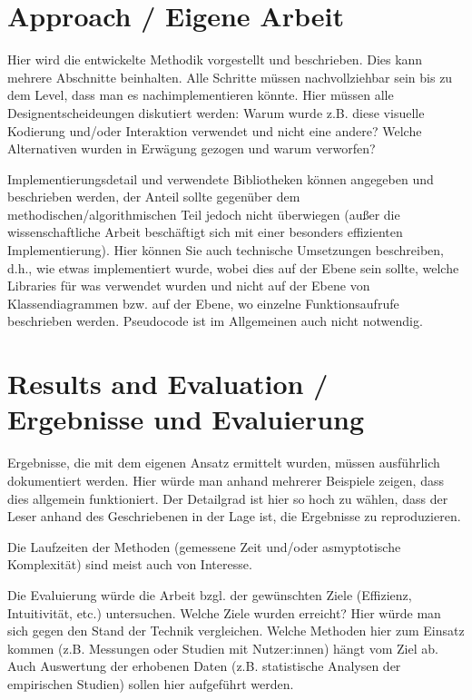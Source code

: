 \documentclass{article}
\begin{document}
\section{Approach / Eigene Arbeit} 
Hier wird die entwickelte Methodik vorgestellt und beschrieben.
Dies kann mehrere Abschnitte beinhalten. Alle Schritte müssen nachvollziehbar sein bis zu dem Level, dass man es nachimplementieren könnte.
Hier müssen alle Designentscheideungen diskutiert werden: Warum wurde z.B. diese visuelle Kodierung und/oder Interaktion verwendet und nicht eine andere? Welche Alternativen wurden in Erwägung gezogen und warum verworfen?

Implementierungsdetail und verwendete Bibliotheken können angegeben und beschrieben werden, der Anteil sollte gegenüber dem methodischen/algorithmischen Teil jedoch nicht überwiegen 
(außer die wissenschaftliche Arbeit beschäftigt sich mit einer besonders effizienten Implementierung).
Hier können Sie auch technische Umsetzungen beschreiben, d.h., wie etwas implementiert wurde, wobei dies auf der Ebene sein sollte, welche Libraries für was verwendet wurden und nicht auf der Ebene von Klassendiagrammen bzw. auf der Ebene, wo einzelne Funktionsaufrufe beschrieben werden. Pseudocode ist im Allgemeinen auch nicht notwendig.


\section{Results and Evaluation / Ergebnisse und Evaluierung} Ergebnisse, die mit dem eigenen Ansatz ermittelt wurden, müssen ausführlich dokumentiert werden. Hier würde man anhand mehrerer Beispiele zeigen, dass dies allgemein funktioniert. Der Detailgrad ist hier so hoch zu wählen, dass der Leser anhand des Geschriebenen in der Lage ist, die Ergebnisse zu reproduzieren. 

Die Laufzeiten der Methoden (gemessene Zeit und/oder asmyptotische Komplexität) sind meist auch von Interesse.

Die Evaluierung würde die Arbeit bzgl. der gewünschten Ziele (Effizienz, Intuitivität, etc.) untersuchen. Welche Ziele wurden erreicht? Hier würde man sich gegen den Stand der Technik vergleichen. Welche Methoden hier zum Einsatz kommen (z.B. Messungen oder Studien mit Nutzer:innen) hängt vom Ziel ab. Auch Auswertung der erhobenen Daten (z.B. statistische Analysen der empirischen Studien) sollen hier aufgeführt werden.
\end{document}
